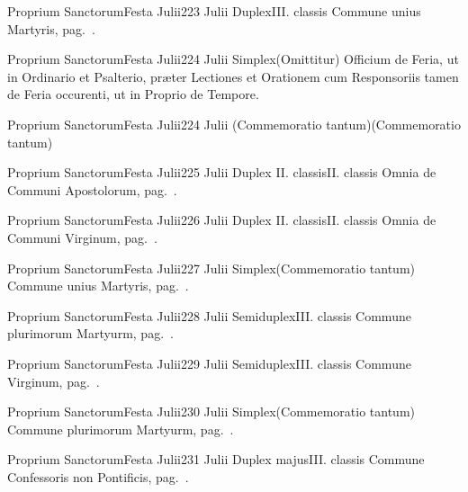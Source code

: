 \documentclass[nocturnale-romanum.tex]{subfiles}
\begin{document}
	{Proprium Sanctorum}{Festa Julii}{2}{23 Julii}
	{Duplex}{III. classis}
	{Commune unius Martyris, pag.\ \pageref{M-UMEX}.}
	{}

	{Proprium Sanctorum}{Festa Julii}{2}{24 Julii}
	{Simplex}{(Omittitur)}
	{Officium de Feria, ut in Ordinario et Psalterio, præter Lectiones et Orationem cum Responsoriis tamen de Feria occurenti, ut in Proprio de Tempore.}
	{}

	{Proprium Sanctorum}{Festa Julii}{2}{24 Julii}
	{(Commemoratio tantum)}{(Commemoratio tantum)}
	{}
	{}

	{Proprium Sanctorum}{Festa Julii}{2}{25 Julii}
	{Duplex II. classis}{II. classis}
	{Omnia de Communi Apostolorum, pag.\ \pageref{M-APEX}.}
	{}

	{Proprium Sanctorum}{Festa Julii}{2}{26 Julii}
	{Duplex II. classis}{II. classis}
	{Omnia de Communi Virginum, pag.\ \pageref{M-MU}.}
	{}

	{Proprium Sanctorum}{Festa Julii}{2}{27 Julii}
	{Simplex}{(Commemoratio tantum)}
	{Commune unius Martyris, pag.\ \pageref{M-UMEX}.}
	{}

	{Proprium Sanctorum}{Festa Julii}{2}{28 Julii}
	{Semiduplex}{III. classis}
	{Commune plurimorum Martyurm, pag.\ \pageref{M-PMEX}.}
	{}

	{Proprium Sanctorum}{Festa Julii}{2}{29 Julii}
	{Semiduplex}{III. classis}
	{Commune Virginum, pag.\ \pageref{M-MU}.}
	{}

	{Proprium Sanctorum}{Festa Julii}{2}{30 Julii}
	{Simplex}{(Commemoratio tantum)}
	{Commune plurimorum Martyurm, pag.\ \pageref{M-PMEX}.}
	{}

	{Proprium Sanctorum}{Festa Julii}{2}{31 Julii}
	{Duplex majus}{III. classis}
	{Commune Confessoris non Pontificis, pag.\ \pageref{M-CONP}.}
	{}
\end{document}
